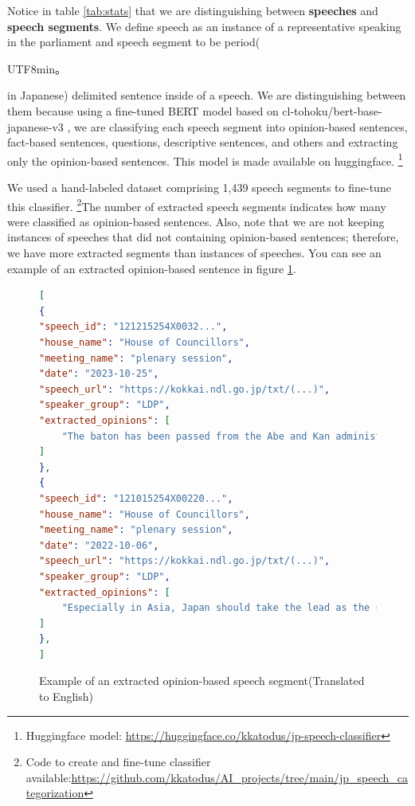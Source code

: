 \documentclass[final,5p,times,twocolumn,authoryear]{elsarticle}
\begin{document}
Notice in table \ref{tab:stats} that we are distinguishing between \textbf{speeches} and \textbf{speech segments}. We define speech as an instance of a representative speaking in the parliament and speech segment to be period(\begin{CJK}{UTF8}{min}。\end{CJK}in Japanese) delimited sentence inside of a speech. We are distinguishing between them because using a fine-tuned BERT model based on cl-tohoku/bert-base-japanese-v3 \citep{Tohoku}, we are classifying each speech segment into opinion-based sentences, fact-based sentences, questions, descriptive sentences, and others and extracting only the opinion-based sentences. This model is made available on huggingface. \footnote{Huggingface model: \url{https://huggingface.co/kkatodus/jp-speech-classifier}} 

We used a hand-labeled dataset comprising 1,439 speech segments to fine-tune this classifier. \footnote{Code to create and fine-tune classifier available:\url{https://github.com/kkatodus/AI_projects/tree/main/jp_speech_categorization}}The number of extracted speech segments indicates how many were classified as opinion-based sentences. Also, note that we are not keeping instances of speeches that did not containing opinion-based sentences; therefore, we have more extracted segments than instances of speeches. You can see an example of an extracted opinion-based sentence in figure \ref{fig:extracted opinion}.
\begin{figure}

\begin{lstlisting}[language=json,firstnumber=1]
[
{
"speech_id": "121215254X0032...",
"house_name": "House of Councillors",
"meeting_name": "plenary session",
"date": "2023-10-25",
"speech_url": "https://kokkai.ndl.go.jp/txt/(...)",
"speaker_group": "LDP",
"extracted_opinions": [
	"The baton has been passed from the Abe and Kan administrations, which took a ..."
]
},
{
"speech_id": "121015254X00220...",
"house_name": "House of Councillors",
"meeting_name": "plenary session",
"date": "2022-10-06",
"speech_url": "https://kokkai.ndl.go.jp/txt/(...)",
"speaker_group": "LDP",
"extracted_opinions": [
	"Especially in Asia, Japan should take the lead as the standard-bearer of freedom and democracy, showing firmness in both security and economy."
]
},
]
\end{lstlisting}
\caption{Example of an extracted opinion-based speech segment(Translated to English)}
\label{fig:extracted opinion}
\end{figure}
\end{document}
